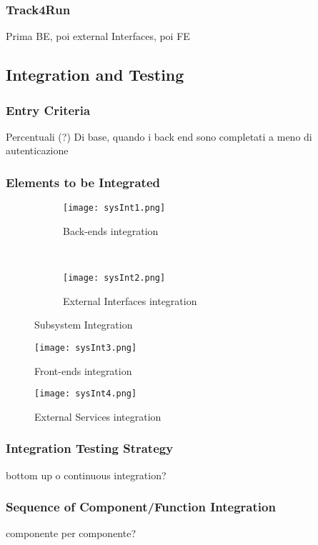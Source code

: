 \subsubsection{Track4Run}
Prima BE, poi external Interfaces, poi FE

\subsection{Integration and Testing}
\subsubsection{Entry Criteria}
Percentuali (?)
Di base, quando i back end sono completati a meno di autenticazione

\subsubsection{Elements to be Integrated}

\FloatBarrier
\begin{figure*}[ht!]
	\centering
	\begin{subfigure}[t]{0.5\textwidth}
		\centering
		\texttt{[image: sysInt1.png]}
		\caption{Back-ends integration}
	\end{subfigure}%
	~ 
	\begin{subfigure}[t]{0.5\textwidth}
		\centering
		\texttt{[image: sysInt2.png]}
		\caption{External Interfaces integration}
	\end{subfigure}

	\caption{Subsystem Integration}
\end{figure*}
\FloatBarrier

\FloatBarrier
\begin{figure}[!h]
	\centering
	\texttt{[image: sysInt3.png]}
	\caption{Front-ends integration}
\end{figure}

\FloatBarrier

\FloatBarrier
\begin{figure}[!h]
	\centering
	\texttt{[image: sysInt4.png]}
	\caption{External Services integration}
\end{figure}

\FloatBarrier


\subsubsection{Integration Testing Strategy}
bottom up o continuous integration?

\subsubsection{Sequence of Component/Function Integration}

componente per componente?
